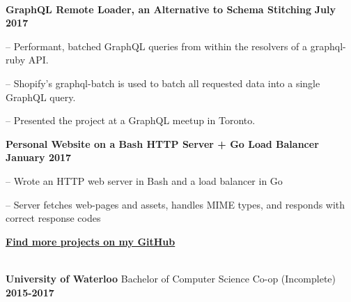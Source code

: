 {    \vspace{0.8cm}
    \\

    \vspace{-0.3cm}
    {\indent
        \textbf{GraphQL Remote Loader, an Alternative to Schema Stitching} \hfill \textbf{July 2017}

        \begin{compactitem}
            \setlength{\itemindent}{0.5cm}
            \item[--] Performant, batched GraphQL queries from within the resolvers of a graphql-ruby API.
            \item[--] Shopify's graphql-batch is used to batch all requested data into a single GraphQL query.
            \item[--] Presented the project at a GraphQL meetup in Toronto.
        \end{compactitem}
    }

     \vspace{0.3cm}
    {\indent
        \textbf{Personal Website on a Bash HTTP Server + Go Load Balancer} \hfill \textbf{January 2017}

        \begin{compactitem}
            \setlength{\itemindent}{0.5cm}
            \item[--]  Wrote an HTTP web server in Bash and a load balancer in Go
            \item[--]  Server fetches web-pages and assets, handles MIME types, and responds with correct response codes
        \end{compactitem}
    }

    \vspace{0.3cm}
    \noindent
    {\indent
        \href{https://github.com/d12}{\textbf{Find more projects on my GitHub}}
    }

    \vspace{0.8cm}
    \\

    \vspace{-0.3cm}
    {\indent
        \textbf{University of Waterloo} Bachelor of Computer Science Co-op (Incomplete) \hfill \textbf{2015-2017}
    }
}

